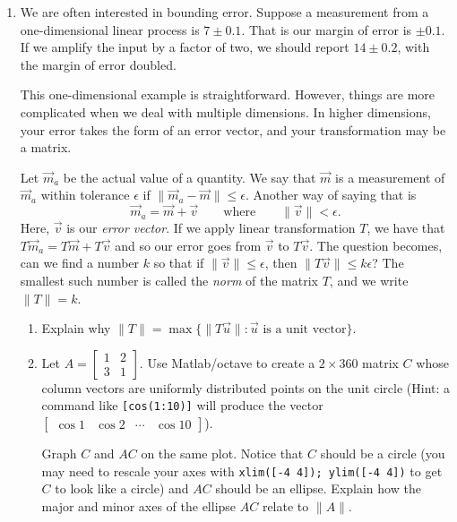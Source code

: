 \documentclass[letter]{article}
\newcommand{\mat}[1]{\begin{bmatrix}#1\end{bmatrix}}
\begin{document}
\begin{enumerate}
		\item
			We are often interested in bounding error.  Suppose a measurement from
			a one-dimensional linear process is $7\pm 0.1$.  That is our margin of
			error is $\pm 0.1$.  If we amplify the input by a factor of two, 
			we should report $14\pm 0.2$, with the margin of error doubled.

			This one-dimensional example is straightforward.
			However, things are more complicated when we deal with multiple dimensions.
			In higher dimensions, your error takes the form of an error vector, and your 
			transformation may be a matrix.

			Let $\vec m_a$ be the actual value of a quantity.  We say that $\vec m$ is
			a measurement of $\vec m_a$ within tolerance $\epsilon$ if 
			$\|\vec m_a-\vec m\|\leq \epsilon$.  Another way of saying that is
			\[
				\vec m_a = \vec m + \vec v\qquad\text{where} \qquad \|\vec v\|<\epsilon.
			\]
			Here, $\vec v$ is our \emph{error vector}.
			If we apply linear
			transformation $T$, we have that $T\vec m_a = T\vec m + T\vec v$ and so
			our error goes from $\vec v$ to $T\vec v$.  The question becomes, can we find a number
			$k$ so that if $\|\vec v\|\leq\epsilon$, then $\|T\vec v\|\leq k\epsilon$?  The smallest
			such number
			is called the \emph{norm} of the matrix $T$, and we write $\|T\|=k$.

			\begin{enumerate}
				\item Explain why $\|T\|=\max \{\|T\vec u\|:\vec u\text{ is a unit vector}\}$.
				\item Let $A=\mat{1&2\\3&1}$.  Use Matlab/octave to 
					create a $2\times 360$ matrix $C$ whose column vectors
					are uniformly distributed points on the unit circle (Hint:
					a command like {\tt [cos(1:10)]} will produce the vector $\mat{\cos 1&\cos 2&\cdots &\cos 10}$).
					
					Graph $C$ and $AC$ on the same plot.  Notice that $C$ 
					should be a circle (you may need to rescale your axes with {\tt xlim([-4 4]); ylim([-4 4])}
					to get $C$ to look like a circle) and $AC$ should be an ellipse.  
					Explain how the major and minor axes of the ellipse $AC$ relate to $\|A\|$.


\end{enumerate}
\end{enumerate}
\end{document}
